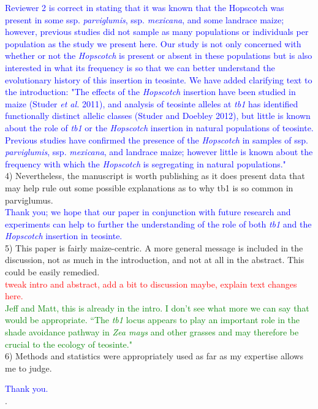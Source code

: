 \documentclass[11pt]{article}
\newcommand{\res}[1]{\noindent \textcolor{blue}{{#1}} \\}
\newcommand{\jri}[1]{\noindent \textcolor{red}{{#1}} \\}
\newcommand{\lev}[1]{\noindent \textcolor{green}{{#1}} \\}
\begin{document}
\res{Reviewer 2 is correct in stating that it was known that the Hopscotch was present in some ssp. \emph{parviglumis}, ssp. \emph{mexicana}, and some landrace maize; however, previous studies did not sample as many populations or individuals per population as the study we present here. Our study is not only concerned with whether or not the \emph{Hopscotch} is present or absent in these populations but is also interested in what its frequency is so that we can better understand the evolutionary history of this insertion in teosinte. We have added clarifying text to the introduction: "The effects of the \emph{Hopscotch} insertion have been studied in maize (Studer \emph{et al.} 2011), and analysis of teosinte alleles at \emph{tb1} has identified functionally distinct allelic classes (Studer and Doebley 2012), but little is known about the role of \emph{tb1} or the \emph{Hopscotch} insertion in natural populations of teosinte. Previous studies have confirmed the presence of the \emph{Hopscotch} in samples of ssp. \emph{parviglumis}, ssp. \emph{mexicana}, and landrace maize; however little is known about the frequency with which the \emph{Hopscotch} is segregating in natural populations."}


4) Nevertheless, the manuscript is worth publishing as it does present data that may help rule out some possible explanations as to why tb1 is so common in parviglumus.\\

\res{Thank you; we hope that our paper in conjunction with future research and experiments can help to further the understanding of the role of both \emph{tb1} and the \emph{Hopscotch} insertion in teosinte.}

5) This paper is fairly maize-centric. A more general message is included in the discussion, not as much in the introduction, and not at all in the abstract. This could be easily remedied.\\

\jri{tweak intro and abstract, add a bit to discussion maybe, explain text changes here.}
\lev{Jeff and Matt, this is already in the intro. I don't see what more we can say that would be appropriate. ``The \emph{tb1} locus appears to play an important role in the shade avoidance pathway in \emph{Zea mays} and other grasses and may therefore be crucial to the ecology of teosinte."}

6) Methods and statistics were appropriately used as far as my expertise allows me to judge.

\res{Thank you.}. 
\end{document}
